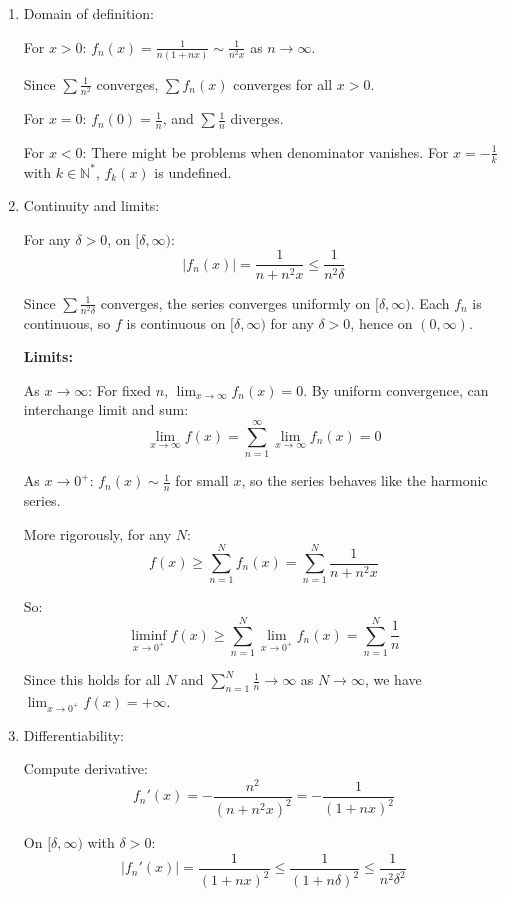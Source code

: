 \documentclass[12pt]{article}
\begin{document}
\begin{answerbox}
\begin{enumerate}
    \item Domain of definition:
    
    For $x > 0$: $f_n(x) = \frac{1}{n(1+nx)} \sim \frac{1}{n^2 x}$ as $n \to \infty$.
    
    Since $\sum \frac{1}{n^2}$ converges, $\sum f_n(x)$ converges for all $x > 0$.
    
    For $x = 0$: $f_n(0) = \frac{1}{n}$, and $\sum \frac{1}{n}$ diverges.
    
    For $x < 0$: There might be problems when denominator vanishes. For $x = -\frac{1}{k}$ with $k \in \mathbb{N}^*$, $f_k(x)$ is undefined.
    
    \item Continuity and limits:
    
    For any $\delta > 0$, on $[\delta, \infty)$:
    \[
    |f_n(x)| = \frac{1}{n+n^2 x} \leq \frac{1}{n^2 \delta}
    \]
    
    Since $\sum \frac{1}{n^2 \delta}$ converges, the series converges uniformly on $[\delta, \infty)$. Each $f_n$ is continuous, so $f$ is continuous on $[\delta, \infty)$ for any $\delta > 0$, hence on $(0, \infty)$.
    
    \textbf{Limits:}
    
    As $x \to \infty$: For fixed $n$, $\lim_{x\to\infty} f_n(x) = 0$.
    By uniform convergence, can interchange limit and sum:
    \[
    \lim_{x\to\infty} f(x) = \sum_{n=1}^\infty \lim_{x\to\infty} f_n(x) = 0
    \]
    
    As $x \to 0^+$: $f_n(x) \sim \frac{1}{n}$ for small $x$, so the series behaves like the harmonic series.
    
    More rigorously, for any $N$:
    \[
    f(x) \geq \sum_{n=1}^N f_n(x) = \sum_{n=1}^N \frac{1}{n+n^2 x}
    \]
    
    So:
    \[
    \liminf_{x\to 0^+} f(x) \geq \sum_{n=1}^N \lim_{x\to 0^+} f_n(x) = \sum_{n=1}^N \frac{1}{n}
    \]
    
    Since this holds for all $N$ and $\sum_{n=1}^N \frac{1}{n} \to \infty$ as $N\to\infty$, we have $\lim_{x\to 0^+} f(x) = +\infty$.
    
    \item Differentiability:
    
    Compute derivative:
    \[
    f_n'(x) = -\frac{n^2}{(n+n^2 x)^2} = -\frac{1}{(1+nx)^2}
    \]
    
    On $[\delta, \infty)$ with $\delta > 0$:
    \[
    |f_n'(x)| = \frac{1}{(1+nx)^2} \leq \frac{1}{(1+n\delta)^2} \leq \frac{1}{n^2 \delta^2}
    \]
    

\end{enumerate}
\end{answerbox}
\end{document}
